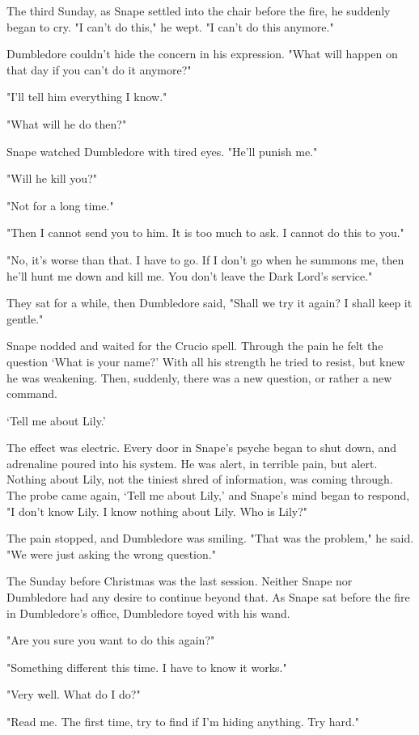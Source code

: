 The third Sunday, as Snape settled into the chair before the fire, he suddenly began to cry. "I can't do this," he wept. "I can't do this anymore."

Dumbledore couldn't hide the concern in his expression. "What will happen on that day if you can't do it anymore?"

"I'll tell him everything I know."

"What will he do then?"

Snape watched Dumbledore with tired eyes. "He'll punish me."

"Will he kill you?"

"Not for a long time."

"Then I cannot send you to him. It is too much to ask. I cannot do this to you."

"No, it's worse than that. I have to go. If I don't go when he summons me, then he'll hunt me down and kill me. You don't leave the Dark Lord's service."

They sat for a while, then Dumbledore said, "Shall we try it again? I shall keep it gentle."

Snape nodded and waited for the Crucio spell. Through the pain he felt the question `What is your name?' With all his strength he tried to resist, but knew he was weakening. Then, suddenly, there was a new question, or rather a new command.

`Tell me about Lily.'

The effect was electric. Every door in Snape's psyche began to shut down, and adrenaline poured into his system. He was alert, in terrible pain, but alert. Nothing about Lily, not the tiniest shred of information, was coming through. The probe came again, `Tell me about Lily,' and Snape's mind began to respond, "I don't know Lily. I know nothing about Lily. Who is Lily?"

The pain stopped, and Dumbledore was smiling. "That was the problem," he said. "We were just asking the wrong question."

The Sunday before Christmas was the last session. Neither Snape nor Dumbledore had any desire to continue beyond that. As Snape sat before the fire in Dumbledore's office, Dumbledore toyed with his wand.

"Are you sure you want to do this again?"

"Something different this time. I have to know it works."

"Very well. What do I do?"

"Read me. The first time, try to find if I'm hiding anything. Try hard."

